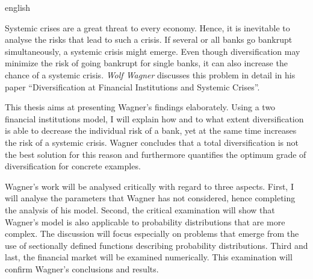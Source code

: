 \begin{otherlanguage*}{english}

Systemic crises are a great threat to every economy. Hence, it is inevitable to analyse the risks that lead to such a crisis. If several or all banks go bankrupt simultaneously, a systemic crisis might emerge. Even though diversification may minimize the risk of going bankrupt for single banks, it can also increase the chance of a systemic crisis. \emph{Wolf Wagner} discusses this problem in detail in his paper \mkbibquote{Diversification at Financial Institutions and Systemic Crises}. 

This thesis aims at presenting Wagner’s findings elaborately. Using a two financial institutions model, I will explain how and to what extent diversification is able to decrease the individual risk of a bank, yet at the same time increases the risk of a systemic crisis. Wagner concludes that a total diversification is not the best solution for this reason and furthermore quantifies the optimum grade of diversification for concrete examples.

Wagner’s work will be analysed critically with regard to three aspects. First, I will analyse the parameters that Wagner has not considered, hence completing the analysis of his model. Second, the critical examination will show that Wagner’s model is also applicable to probability distributions that are more complex. The discussion will focus especially on problems that emerge from the use of sectionally defined functions describing probability distributions. Third and last, the financial market will be examined numerically. This examination will confirm Wagner’s conclusions and results. 

\end{otherlanguage*}
